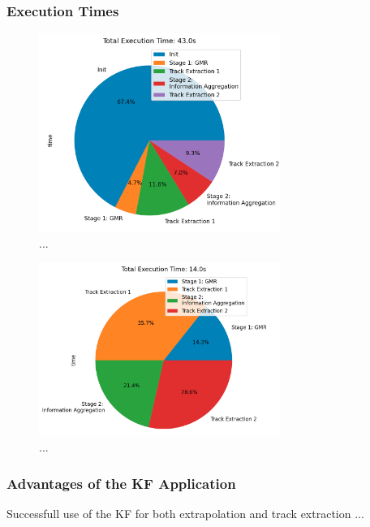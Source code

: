 \subsubsection{Execution Times}

\begin{figure}[htbp]
    \centering
    \includegraphics[width=0.7\textwidth]{images/7-results/execution-time-endcap-1.png}
    \caption{...}
    \label{fig:execution-time-endcap-1}%
\end{figure}

\begin{figure}[htbp]
    \centering
    \includegraphics[width=0.7\textwidth]{images/7-results/execution-time-endcap-2.png}
    \caption{...}
    \label{fig:execution-time-endcap-2}%
\end{figure}




\subsubsection{Advantages of the KF Application}
Successfull use of the KF for both extrapolation and track extraction ...

